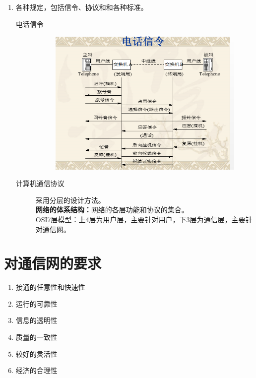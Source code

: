 \begin{enumerate}
	\item 各种规定，包括信令、协议和和各种标准。
	\begin{description}
		\item[电话信令]
		 \begin{figure}[htbp]
			\centering
			\includegraphics[width=0.7\linewidth]{figures/screenshot024}
			\caption{}
			\label{fig:screenshot024}
		\end{figure}
		\item[计算机通信协议] 采用分层的设计方法。\\
		\textbf{网络的体系结构：}网络的各层功能和协议的集合。\\
		OSI7层模型：上4层为用户层，主要针对用户，下3层为通信层，主要针对通信网。
	\end{description}
\end{enumerate}
\section{对通信网的要求}
\begin{enumerate}
	\item 接通的任意性和快速性
	\item 运行的可靠性
	\item 信息的透明性
	\item 质量的一致性
	\item 较好的灵活性           
	\item 经济的合理性
	
\end{enumerate}
